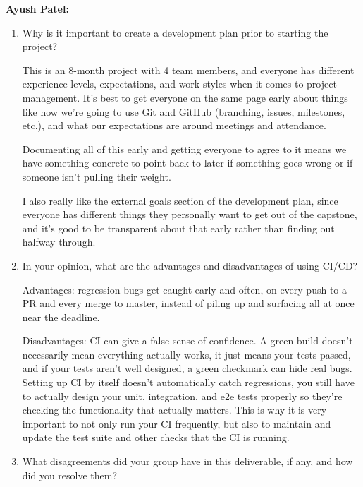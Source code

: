 \documentclass{article}
\begin{document}
\textbf{Ayush Patel:}

\begin{enumerate}
    \item Why is it important to create a development plan prior to starting
          the project?

          This is an 8-month project with 4 team members, and everyone has
          different experience levels, expectations, and work styles when it
          comes to project management. It's best to get everyone on the same
          page early about things like how we're going to use Git and GitHub
          (branching, issues, milestones, etc.), and what our expectations are
          around meetings and attendance.

          Documenting all of this early and getting everyone to agree to it
          means we have something concrete to point back to later if something
          goes wrong or if someone isn't pulling their weight.

          I also really like the external goals section of the development
          plan, since everyone has different things they personally want to get
          out of the capstone, and it's good to be transparent about that early
          rather than finding out halfway through.

    \item In your opinion, what are the advantages and disadvantages of using
          CI/CD?

          Advantages: regression bugs get caught early and often, on every push
          to a PR and every merge to master, instead of piling up and surfacing
          all at once near the deadline.

          Disadvantages: CI can give a false sense of confidence. A green build
          doesn't necessarily mean everything actually works, it just means
          your tests passed, and if your tests aren't well designed, a green
          checkmark can hide real bugs. Setting up CI by itself doesn't
          automatically catch regressions, you still have to actually design
          your unit, integration, and e2e tests properly so they're checking
          the functionality that actually matters. This is why it is very
          important to not only run your CI frequently, but also to maintain
          and update the test suite and other checks that the CI is running.

    \item What disagreements did your group have in this deliverable, if any,
          and how did you resolve them?


\end{enumerate}
\end{document}

